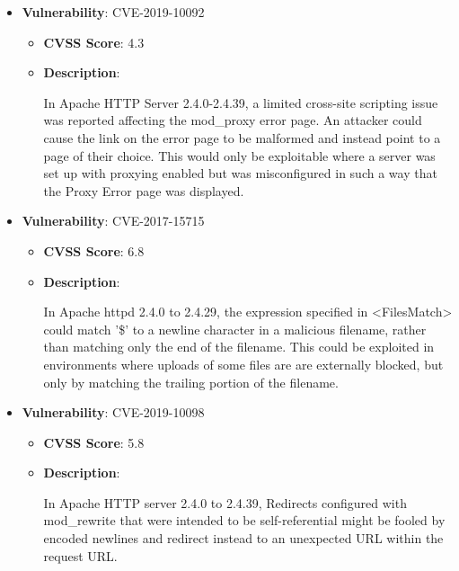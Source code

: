 \documentclass{article}
\begin{document}
\begin{itemize}
        \item \textbf{Vulnerability}: CVE-2019-10092
        \begin{itemize}
            \item \textbf{CVSS Score}:  4.3 
            \item \textbf{Description}:
            \parbox[t]{0.9\linewidth}{
                \ttfamily In Apache HTTP Server 2.4.0-2.4.39, a limited cross-site scripting issue was reported affecting the mod\_proxy error page. An attacker could cause the link on the error page to be malformed and instead point to a page of their choice. This would only be exploitable where a server was set up with proxying enabled but was misconfigured in such a way that the Proxy Error page was displayed.
            }
        \end{itemize}
    
        \item \textbf{Vulnerability}: CVE-2017-15715
        \begin{itemize}
            \item \textbf{CVSS Score}:  6.8 
            \item \textbf{Description}:
            \parbox[t]{0.9\linewidth}{
                \ttfamily In Apache httpd 2.4.0 to 2.4.29, the expression specified in <FilesMatch> could match '\$' to a newline character in a malicious filename, rather than matching only the end of the filename. This could be exploited in environments where uploads of some files are are externally blocked, but only by matching the trailing portion of the filename.
            }
        \end{itemize}
    
        \item \textbf{Vulnerability}: CVE-2019-10098
        \begin{itemize}
            \item \textbf{CVSS Score}:  5.8 
            \item \textbf{Description}:
            \parbox[t]{0.9\linewidth}{
                \ttfamily In Apache HTTP server 2.4.0 to 2.4.39, Redirects configured with mod\_rewrite that were intended to be self-referential might be fooled by encoded newlines and redirect instead to an unexpected URL within the request URL.
            }
        \end{itemize}
    

\end{itemize}
\end{document}
